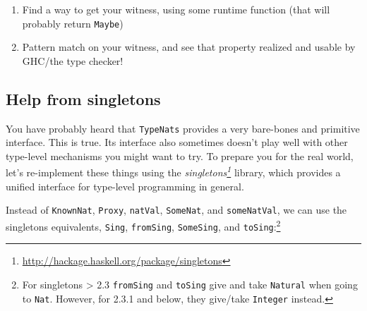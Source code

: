 \documentclass[]{article}
\renewcommand{\href}[2]{#2\footnote{\url{#1}}}
\begin{document}
\begin{enumerate}
\def\labelenumi{\arabic{enumi}.}
\tightlist
\item
  Find a way to get your witness, using some runtime function (that will
  probably return \texttt{Maybe})
\item
  Pattern match on your witness, and see that property realized and usable by
  GHC/the type checker!
\end{enumerate}

\subsection{Help from singletons}\label{help-from-singletons}

You have probably heard that \texttt{TypeNats} provides a very bare-bones and
primitive interface. This is true. Its interface also sometimes doesn't play
well with other type-level mechanisms you might want to try. To prepare you for
the real world, let's re-implement these things using the
\emph{\href{http://hackage.haskell.org/package/singletons}{singletons}} library,
which provides a unified interface for type-level programming in general.

Instead of \texttt{KnownNat}, \texttt{Proxy}, \texttt{natVal}, \texttt{SomeNat},
and \texttt{someNatVal}, we can use the singletons equivalents, \texttt{Sing},
\texttt{fromSing}, \texttt{SomeSing}, and \texttt{toSing}:\footnote{For
  singletons \textgreater{} 2.3 \texttt{fromSing} and \texttt{toSing} give and
  take \texttt{Natural} when going to \texttt{Nat}. However, for 2.3.1 and
  below, they give/take \texttt{Integer} instead.}
\end{document}
